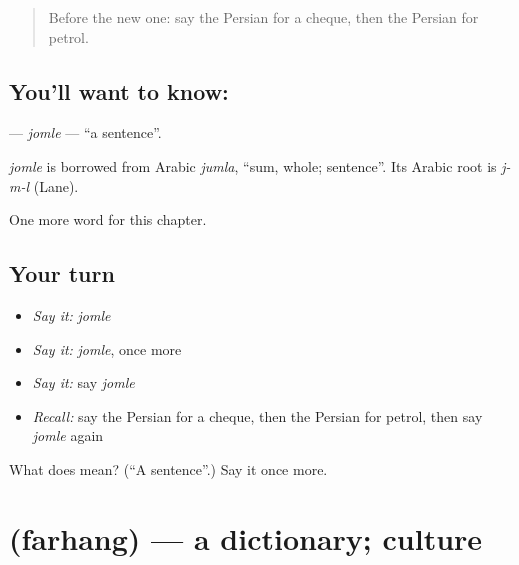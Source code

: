 \label{lesson:FA-C242-jomle}



\begin{quote}
Before the new one: say the Persian for a cheque, then the Persian for petrol.
\end{quote}

\subsection*{You'll want to know: }
\textbf{} — \emph{jomle} — \textquotedblleft{}a sentence\textquotedblright{}.

\begin{cousinweb}
\emph{jomle} is borrowed from Arabic \emph{jumla}, \textquotedblleft{}sum, whole; sentence\textquotedblright{}. Its Arabic root is \emph{j-m-l} (Lane).
\end{cousinweb}

\begin{grammarlens}[title={What you've built}]
One more word for this chapter.
\end{grammarlens}

\subsection*{Your turn}
\begin{itemize}
\raggedright
  \item \emph{Say it:} \emph{jomle}
  \item \emph{Say it:} \emph{jomle}, once more
  \item \emph{Say it:} say \emph{jomle}
  \item \emph{Recall:} say the Persian for a cheque, then the Persian for petrol, then say \emph{jomle} again
\end{itemize}

\begin{tcolorbox}[breakable,colback=teal!4,colframe=teal!35!black,title={Before you move on}]
What does  mean? (\textquotedblleft{}A sentence\textquotedblright{}.) Say it once more.
\end{tcolorbox}
\section[\texorpdfstring{\fa{فرهنگ} (farhang)}{فرهنگ (farhang)}]{ (farhang) — a dictionary; culture}

\label{lesson:FA-C242-farhang}



